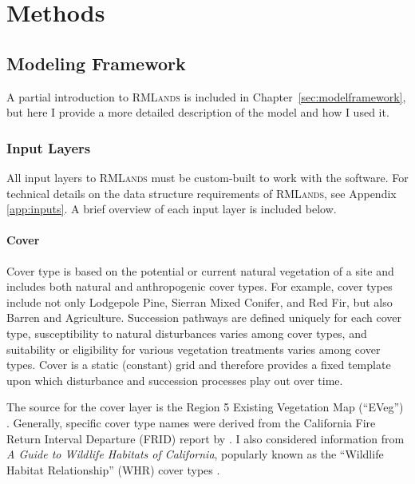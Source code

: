 
\section{Methods}
\label{sec:hrvmethods}


\subsection{Modeling Framework}
\label{sec:modelframe}

A partial introduction to \textsc{RMLands} is included in Chapter~\ref{sec:modelframework}, but here I provide a more detailed description of the model and how I used it. 

\subsubsection*{Input Layers}
\label{subsec:hrvinputlayers}

All input layers to \textsc{RMLands} must be custom-built to work with the software. For technical details on the data structure requirements of \textsc{RMLands}, see Appendix \ref{app:inputs}. A brief overview of each input layer is included below.

\paragraph*{Cover} Cover type is based on the potential or current natural vegetation of a site and includes both natural and anthropogenic cover types. For example, cover types include not only Lodgepole Pine, Sierran Mixed Conifer, and Red Fir, but also Barren and Agriculture. Succession pathways are defined uniquely for each cover type, susceptibility to natural disturbances varies among cover types, and suitability or eligibility for various vegetation treatments varies among cover types. Cover is a static (constant) grid and therefore provides a fixed template upon which disturbance and succession processes play out over time. 

The source for the cover layer is the Region 5 Existing Vegetation Map (``EVeg'') \citep{USDAForestService2009}. Generally, specific cover type names were derived from the California Fire Return Interval Departure (FRID) report by \citet{VandeWater2011}. I also considered information from \emph{A Guide to Wildlife Habitats of California}, popularly known as the ``Wildlife Habitat Relationship'' (WHR) cover types \citep{WHR1988}. 

